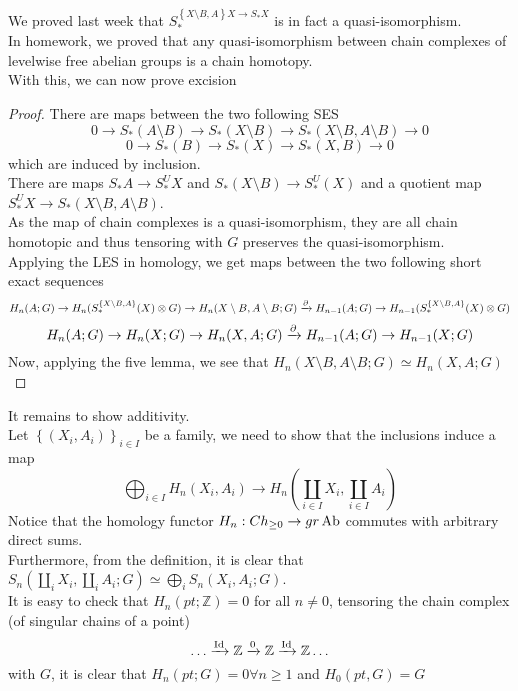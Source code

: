 \documentclass[../main.tex]{subfiles}
\begin{document}
We proved last week that $S_\ast^{ \left\{ X\setminus B, A \right\} X \to S_\ast X}$ is in fact a quasi-isomorphism.\\
In homework, we proved that any quasi-isomorphism between chain complexes of levelwise free abelian groups is a chain homotopy.\\
With this, we can now prove excision
\begin{proof}
There are maps between the two following SES
\[ 
0 \to S_\ast( A\setminus B) \to S_\ast( X\setminus B) \to S_\ast( X\setminus B, A \setminus B) \to 0
\]
\[ 
0 \to S_\ast(B) \to S_\ast( X) \to S_\ast( X, B) \to 0
\]
which are induced by inclusion.\\
There are maps $S_\ast A \to S_\ast^{U}X$ and $S_\ast( X\setminus B) \to S_\ast^{U}( X) $ and a quotient map $S_\ast^{U}X \to S_\ast( X\setminus B,A\setminus B) $.\\
As the map of chain complexes is a quasi-isomorphism, they are all chain homotopic and thus tensoring with $G$ preserves the quasi-isomorphism.\\
Applying the LES in homology, we get maps between the two following short exact sequences
\[ 
	H_n( A;G) \to H_n( S_\ast^{ \left\{ X\setminus B, A \right\} }( X) \otimes G)  \to H_n( X\setminus B, A\setminus B;G) \xrightarrow{\partial} H_{n-1} ( A;G) \to H_{n-1} ( S_\ast^{ \left\{ X\setminus B,A \right\} } ( X)\otimes G) 
\]
\[ 
	H_n( A;G) \to H_n( X;G) \to H_n( X,A;G) \xrightarrow{\partial} H_{n-1} ( A;G) \to H_{n-1} ( X;G) 
\]
Now, applying the five lemma, we see that $H_n( X\setminus B, A\setminus B;G) \simeq H_n( X,A;G) $ 
\end{proof}
It remains to show additivity.\\
Let $\left\{( X_i,A_i) \right\}_{i \in I} $ be a family, we need to show that the inclusions induce a map
\[ 
\bigoplus_{i\in I} H_n( X_i,A_i) \to H_n \left( \coprod_{i\in I} X_i, \coprod_{i \in I} A_i\right) 
\]
Notice that the homology functor $H_n: Ch_{ \geq 0} \to gr\operatorname{Ab}$ commutes with arbitrary direct sums.\\
Furthermore, from the definition, it is clear that $S_n( \coprod_i X_i,\coprod_i A_i;G) \simeq \bigoplus_i S_n( X_i,A_i;G) $.\\
It is easy to check that $H_n( pt; \mathbb{Z}) = 0$ for all $ n \neq 0$, tensoring the chain complex (of singular chains of a point)
\[ 
	\ldots \xrightarrow{\operatorname{Id}} \mathbb{Z}\xrightarrow{0} \mathbb{Z} \xrightarrow{ \operatorname{Id}} \mathbb{Z}\ldots
\]
with $G$, it is clear that $H_n( pt; G) =0\forall n \geq 1$ and $H_0( pt, G) = G$ 


		
\end{document}
